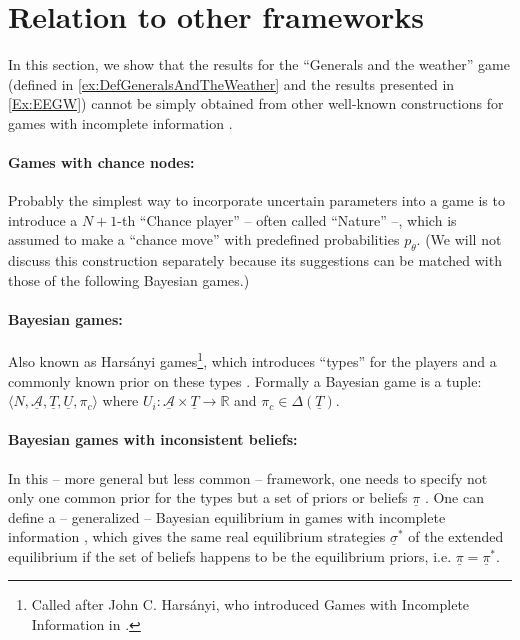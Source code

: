 \documentclass{article}
\theoremstyle{definition}
\begin{document}
\section{Relation to other frameworks}

In this section, we show that the results for the ``Generals and the weather'' game (defined in \ref{ex:DefGeneralsAndTheWeather} and the results presented in \ref{Ex:EEGW})  cannot be simply obtained from other well-known constructions for games with incomplete information \cite{book:GameTheory}.

\paragraph{Games with chance nodes:}
Probably the simplest way to incorporate uncertain parameters into a game is to introduce a $N+1$-th ``Chance player'' -- often called ``Nature'' --, which is assumed to make a ``chance move'' with predefined probabilities $p_\theta$.
(We will not discuss this construction separately because its suggestions can be matched with those of the following Bayesian games.)

\paragraph{Bayesian games:}
Also known as Harsányi games\footnote{Called after John C. Harsányi, who introduced Games with Incomplete Information in \cite{paper:Harsanyi_I,paper:Harsanyi_II,paper:Harsanyi_III}.}, which introduces ``types'' for the players and a commonly known prior on these types \cite{paper:ZamirBayesianGames,book:GameTheory}. Formally a Bayesian game is a tuple: $\langle N, \underline{\mathcal{A}}, \underline{T}, \underline{U}, \pi_c \rangle$ where $U_i : \underline{\mathcal{A}} \times \underline{T} \to \mathbb{R}$ and $\pi_c \in \Delta(\underline{T})$.

\paragraph{Bayesian games with inconsistent beliefs:}
In this -- more general but less common -- framework, one needs to specify not only one common prior for the types but a set of priors or beliefs $\underline{\pi}$ \cite{book:GameTheory}.
One can define a -- generalized -- Bayesian equilibrium in games with incomplete information \cite{book:GameTheory}, which gives the same real equilibrium strategies $\underline{\sigma}^*$ of the extended equilibrium if the set of beliefs happens to be the equilibrium priors, i.e. $\underline{\pi} = \underline{\pi}^*$.
\end{document}

